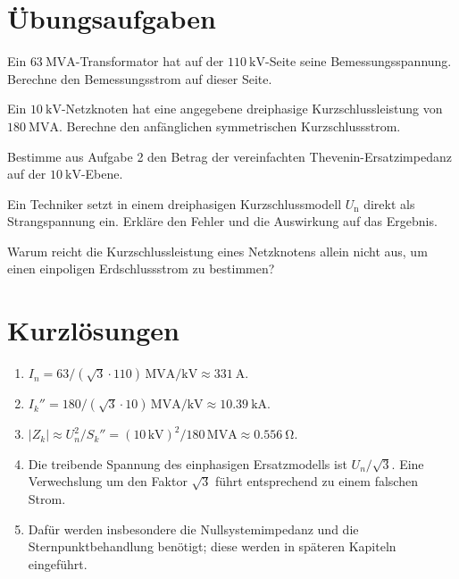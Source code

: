 \section{Übungsaufgaben}

\begin{aufgaben}
  \item Ein \(\SI{63}{\mega\volt\ampere}\)-Transformator hat auf der
        \(\SI{110}{\kilo\volt}\)-Seite seine Bemessungsspannung.
        Berechne den Bemessungsstrom auf dieser Seite.
  \item Ein \(\SI{10}{\kilo\volt}\)-Netzknoten hat eine angegebene
        dreiphasige Kurzschlussleistung von \(\SI{180}{\mega\volt\ampere}\).
        Berechne den anfänglichen symmetrischen Kurzschlussstrom.
  \item Bestimme aus Aufgabe 2 den Betrag der vereinfachten
        Thevenin-Ersatzimpedanz auf der \(\SI{10}{\kilo\volt}\)-Ebene.
  \item Ein Techniker setzt in einem dreiphasigen Kurzschlussmodell
        \(U_\mathrm{n}\) direkt als Strangspannung ein. Erkläre den Fehler
        und die Auswirkung auf das Ergebnis.
  \item Warum reicht die Kurzschlussleistung eines Netzknotens allein
        nicht aus, um einen einpoligen Erdschlussstrom zu bestimmen?
\end{aufgaben}

\section{Kurzlösungen}

\begin{enumerate}[label=\arabic*.]
  \item \(I_n=63/(\sqrt{3}\cdot110)\,\si{\mega\volt\ampere\per\kilo\volt}
        \approx\SI{331}{\ampere}\).
  \item \(I_k''=180/(\sqrt{3}\cdot10)\,\si{\mega\volt\ampere\per\kilo\volt}
        \approx\SI{10.39}{\kilo\ampere}\).
  \item \(|Z_k|\approx U_n^2/S_k''=(10\,\si{\kilo\volt})^2/
        180\,\si{\mega\volt\ampere}\approx\SI{0.556}{\ohm}\).
  \item Die treibende Spannung des einphasigen Ersatzmodells ist
        \(U_n/\sqrt{3}\). Eine Verwechslung um den Faktor \(\sqrt{3}\)
        führt entsprechend zu einem falschen Strom.
  \item Dafür werden insbesondere die Nullsystemimpedanz und die
        Sternpunktbehandlung benötigt; diese werden in späteren Kapiteln
        eingeführt.
\end{enumerate}